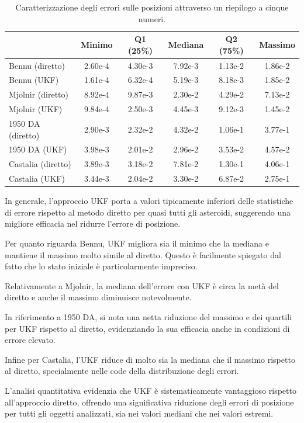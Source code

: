 \documentclass[12pt,a4paper,openright,twoside]{book}
\begin{document}
\begin{table}[!h]
\begin{tabular*}{\textwidth}{@{\extracolsep{\fill}}lccccc@{}}
                   & Minimo  & Q1 (25\%) & Mediana & Q2 (75\%) & Massimo \\\toprule
Bennu (diretto)    & 2.60e-4 & 4.30e-3 & 7.92e-3 & 1.13e-2 & 1.86e-2 \\
Bennu (UKF)        & 1.61e-4 & 6.32e-4 & 5.19e-3 & 8.18e-3 & 1.85e-2 \\\midrule
Mjolnir (diretto)  & 8.92e-4 & 9.87e-3 & 2.30e-2 & 4.29e-2 & 7.13e-2 \\
Mjolnir (UKF)      & 9.84e-4 & 2.50e-3 & 4.45e-3 & 9.12e-3 & 1.45e-2 \\\midrule
1950 DA (diretto)  & 2.90e-3 & 2.32e-2 & 4.32e-2 & 1.06e-1 & 3.77e-1 \\
1950 DA (UKF)      & 3.98e-3 & 2.01e-2 & 2.96e-2 & 3.53e-2 & 4.57e-2 \\\midrule
Castalia (diretto) & 3.89e-3 & 3.18e-2 & 7.81e-2 & 1.30e-1 & 4.06e-1 \\
Castalia (UKF)     & 3.44e-3 & 2.04e-2 & 3.30e-2 & 6.87e-2 & 2.75e-1 \\\midrule
\end{tabular*}
\caption{Caratterizzazione degli errori sulle posizioni attraverso un riepilogo a cinque numeri.}
\label{tab:results}
\end{table}

In generale, l'approccio UKF porta a valori tipicamente inferiori delle statistiche di errore rispetto al metodo diretto per quasi tutti gli asteroidi, suggerendo una migliore efficacia nel ridurre l'errore di posizione.

Per quanto riguarda Bennu, UKF migliora sia il minimo che la mediana e mantiene il massimo molto simile al diretto. Questo è facilmente spiegato dal fatto che lo stato iniziale è particolarmente impreciso.

Relativamente a Mjolnir, la mediana dell'errore con UKF è circa la metà del diretto e anche il massimo diminuisce notevolmente.

In riferimento a 1950 DA, si nota una netta riduzione del massimo e dei quartili per UKF rispetto al diretto, evidenziando la sua efficacia anche in condizioni di errore elevato.

Infine per Castalia, l'UKF riduce di molto sia la mediana che il massimo rispetto al diretto, specialmente nelle code della distribuzione degli errori.

L'analisi quantitativa evidenzia che UKF è sistematicamente vantaggioso rispetto all'approccio diretto, offrendo una significativa riduzione degli errori di posizione per tutti gli oggetti analizzati, sia nei valori mediani che nei valori estremi.
\end{document}
